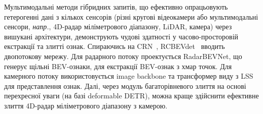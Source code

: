 Мультимодальні методи гібридних запитів, що ефективно опрацьовують гетерогенні дані з кількох сенсорів (різні кругові відеокамери або мультимодальні сенсори, \textit{напр.}, 4D-радар міліметрового діапазону, LiDAR, камера) через вишукані архітектури, демонструють чудові здатності у часово-просторовій екстракції та злитті ознак.
Спираючись на CRN~\cite{kim2023crn}, RCBEVdet~\cite{lin2024rcbevdet} вводить двопотокову мережу. Для радарного потоку проектується RadarBEVNet, що генерує щільні BEV-ознаки, для екстракції BEV-ознак з хмар точок.
Для камерного потоку використовується image backbone та трансформер виду з LSS~\cite{philion2020lift} для представлення ознак.
Далі, через модуль багаторівневого злиття на основі перехресної уваги (на базі deformable DETR), можна краще здійснити ефективне злиття 4D-радар міліметрового діапазону з камерою.
